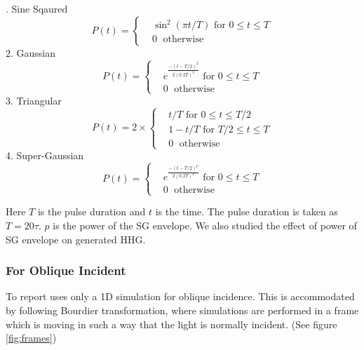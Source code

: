 . Sine Sqaured
\begin{equation}
    \label{eq:sin-sq-env}
    P(t)=
    \begin{cases}
         & \sin^2(\pi t/T) \text{ for } 0 \leq t \le T \\
         & 0         \;      \text{ otherwise }
    \end{cases}
\end{equation}
2. Gaussian
\begin{equation}
    \label{eq:gaussian-env}
    P(t)=
    \begin{cases}
         & e^{\frac{-(t-T/2)^2}{2(0.2T)^2}} \text{ for } 0 \leq t \le T \\
         & 0         \;      \text{ otherwise }
    \end{cases}
\end{equation}
3. Triangular
\begin{equation}
    \label{eq:triangle-env}
    P(t)= 2\times
    \begin{cases}
         & t/T \text{ for } 0 \leq t \le T/2    \\
         & 1-t/T \text{ for } T/2 \leq t \le T  \\
         & 0         \;      \text{ otherwise }
    \end{cases}
\end{equation}
4. Super-Gaussian
\begin{equation}
    \label{eq:sg-env}
    P(t)=
    \begin{cases}
         & e^{\frac{-(t-T/2)^p}{2(0.2T)^p}} \text{ for } 0 \leq t \le T \\
         & 0         \;      \text{ otherwise }
    \end{cases}
\end{equation}

Here $T$ is the pulse duration and $t$ is the time. The pulse duration is taken as $T = 20 \tau$. $p$ is the power of the SG envelope. We also studied the effect of power of SG envelope on generated HHG.

\subsubsection{For Oblique Incident}
To report uses only a 1D simulation for oblique incidence. This is accommodated by following Bourdier transformation\cite{2d-transformation}, where simulations are performed in a frame which is moving in such a way that the light is normally incident. (See figure \ref{fig:frames})

